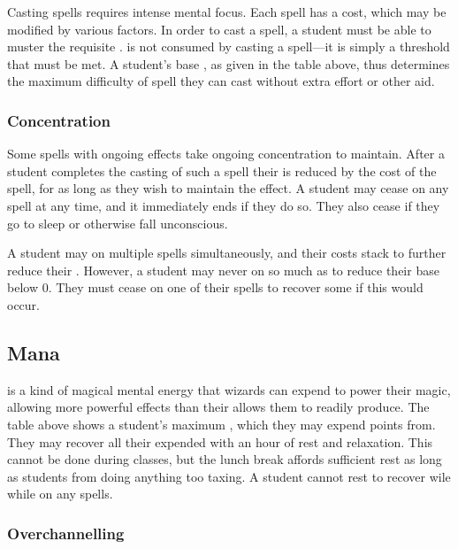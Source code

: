 Casting spells requires intense mental focus.
Each spell has a {\focus} cost, which may be modified by various factors.
In order to cast a spell, a student must be able to muster the requisite {\focus}.
\capital{\focus} is not consumed by casting a spell---it is simply a threshold that must be met.
A student's base {\focus}, as given in the table above, thus determines the maximum difficulty of spell they can cast without extra effort or other aid.

\subsubsection{Concentration}

Some spells with ongoing effects take ongoing concentration to maintain.
After a student completes the casting of such a spell their {\focus} is reduced by the {\concentration} cost of the spell, for as long as they wish to maintain the effect.
A student may cease {\concentrating} on any spell at any time, and it immediately ends if they do so.
They also cease {\concentrating} if they go to sleep or otherwise fall unconscious.

A student may {\concentrate} on multiple spells simultaneously, and their {\concentration} costs stack to further reduce their {\focus}.
However, a student may never {\concentrate} on so much as to reduce their base {\focus} below 0.
They must cease {\concentrating} on one of their spells to recover some {\focus} if this would occur.

\subsection{Mana}

\capital{\mana} is a kind of magical mental energy that wizards can expend to power their magic, allowing more powerful effects than their {\focus} allows them to readily produce.
The table above shows a student's maximum {\mana}, which they may expend points from.
They may recover all their expended {\mana} with an hour of rest and relaxation.
This cannot be done during classes, but the lunch break affords sufficient rest as long as students from doing anything too taxing.
A student cannot rest to recover wile {\mana} while {\concentrating} on any spells.

\subsubsection{Overchannelling}


